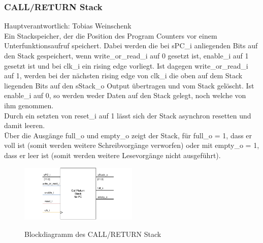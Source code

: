 \documentclass[bibliography=totoc,listof=totoc,index=totoc]{scrartcl}
\begin{document}
\subsubsection{CALL/RETURN Stack}
\begin{multicols}{2}
Hauptverantwortlich: Tobias Weinschenk\\
Ein Stackspeicher, der die Position des Program Counters vor einem Unterfunktionsaufruf speichert. Dabei werden die bei sPC\_i anliegenden Bits auf den Stack gespeichert, wenn write\_or\_read\_i auf 0 gesetzt ist, enable\_i auf 1 gesetzt ist und bei clk\_i ein rising edge vorliegt. Ist dagegen write\_or\_read\_i auf 1, werden bei der nächsten rising edge von clk\_i die oben auf dem Stack liegenden Bits auf den sStack\_o Output übertragen und vom Stack gelöscht. Ist enable\_i auf 0, so werden weder Daten auf den Stack gelegt, noch welche von ihm genommen. \\
Durch ein setzten von reset\_i auf 1 lässt sich der Stack asynchron resetten und damit leeren. \\
Über die Ausgänge full\_o und empty\_o zeigt der Stack, für full\_o = 1, dass er voll ist (somit werden weitere Schreibvorgänge verworfen) oder mit empty\_o = 1, dass er leer ist (somit werden weitere Lesevorgänge nicht ausgeführt).
\begin{figure}[H]
    \centering
    \includegraphics[width=0.5\textwidth]{Stack_beschreibung.pdf}\\
    \caption{Blockdiagramm des CALL/RETURN Stack}
    \label{fig:Block_Stack}
\end{figure}
\end{multicols}
\end{document}
